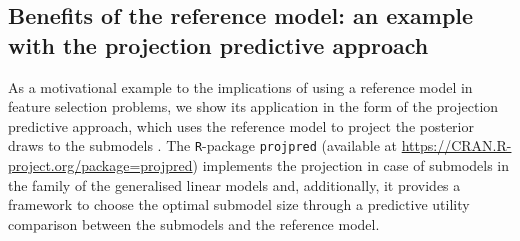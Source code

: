 \documentclass[american,]{article}
\theoremstyle{definition}
\begin{document}
\hypertarget{projection}{%
\subsection{Benefits of the reference model: an example with the projection predictive approach}\label{projection}}

As a motivational example to the implications of using a reference
model in feature selection problems, we show its application in the
form of the projection predictive approach, which uses the reference
model to project the posterior draws to the submodels
\citep{paper:original_proj}. The \texttt{R}-package \texttt{projpred}
(available at \url{https://CRAN.R-project.org/package=projpred})
implements the projection in case of submodels in the family of the
generalised linear models and, additionally, it provides a framework
to choose the optimal submodel size through a predictive utility
comparison between the submodels and the reference model.
\end{document}
